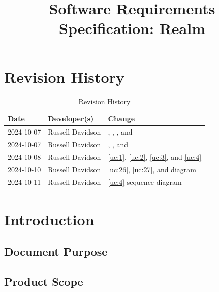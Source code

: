 \documentclass{article}
\title{Software Requirements Specification: Realm\\\progname}
\author{\authname}
\date{}
\begin{document}
\maketitle

\newpage{}

\tableofcontents

\section*{Revision History}

\begin{table}[hp]
\caption{Revision History} \label{TblRevisionHistory}
\begin{tabularx}{\textwidth}{llX}
\toprule
\textbf{Date} & \textbf{Developer(s)} & \textbf{Change}\\
\midrule
2024-10-07 & Russell Davidson & \nameref{sub:compliance}, \nameref{ssub:installation}, \nameref{ssub:distribution}, and \nameref{ssub:portability} \\
2024-10-07 & Russell Davidson & \nameref{ssub:tutorial}, \nameref{ssub:tour_management}, and \nameref{ssub:touring} \\
2024-10-08 & Russell Davidson & \ref{uc:1}, \ref{uc:2}, \ref{uc:3}, and \ref{uc:4} \\
2024-10-10 & Russell Davidson & \ref{uc:26}, \ref{uc:27}, and \nameref{sub:use_cases} diagram\\
2024-10-11 & Russell Davidson & \ref{uc:4} sequence diagram\\
\bottomrule
\end{tabularx}
\end{table}

\section{Introduction}

\subsection{Document Purpose}


\subsection{Product Scope}
\end{document}

